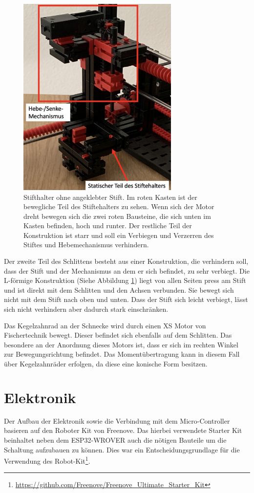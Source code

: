 \documentclass[conference,compsoc,final,a4paper]{IEEEtran}
\begin{document}
\begin{figure}[h]
\centering
\includegraphics[width=8cm]{../images/zAchse2.png}
\caption{Stifthalter ohne angeklebter Stift. Im roten Kasten ist der bewegliche Teil des Stiftehalters zu sehen. Wenn sich der Motor dreht bewegen sich die zwei roten Bausteine, die 
sich unten im Kasten befinden, hoch und runter. Der restliche Teil der Konstruktion ist starr und soll ein Verbiegen und Verzerren des Stiftes und Hebemechanismus verhindern.}
\label{fig:AufbauzAchse2}
\end{figure}

Der zweite Teil des Schlittens besteht aus einer Konstruktion, die verhindern soll, dass der Stift und der Mechanismus an dem er sich befindet, zu sehr verbiegt. Die L-förmige
Konstruktion (Siehe Abbildung \ref{fig:AufbauzAchse2}) liegt von allen Seiten press am Stift und ist direkt mit dem Schlitten und den Achsen verbunden. Sie bewegt sich nicht mit
dem Stift nach oben und unten. Dass der Stift sich leicht verbiegt, lässt sich nicht verhindern aber dadurch stark einschränken.

Das Kegelzahnrad an der Schnecke wird durch einen XS Motor von Fischertechnik bewegt. Dieser befindet sich ebenfalls auf dem Schlitten. Das besondere an der Anordnung dieses Motors ist, dass er sich im rechten Winkel zur Bewegungsrichtung befindet. Das Momentübertragung kann in diesem Fall über Kegelzahnräder erfolgen, da diese eine konische Form besitzen.


\section{Elektronik}
Der Aufbau der Elektronik sowie die Verbindung mit dem Micro-Controller basieren auf den Roboter Kit von Freenove. 
Das hierbei verwendete Starter Kit beinhaltet neben dem ESP32-WROVER auch die nötigen Bauteile um die Schaltung aufzubauen zu können. 
Dies war ein Entscheidungsgrundlage für die Verwendung des Robot-Kit\footnote{\url{https://github.com/Freenove/Freenove\_Ultimate\_Starter\_Kit}}.
\\
\end{document}

